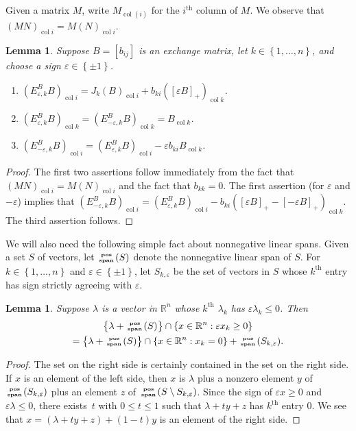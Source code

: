 \documentclass{amsart}
\newtheorem{lemma}[proposition]{Lemma}
\theoremstyle{definition}
\theoremstyle{remark}
\numberwithin{equation}{section}
\newcommand{\reals}{\mathbb R}
\newcommand{\ep}{\varepsilon}
\newcommand{\col}{\operatorname{col}}
\newcommand{\sgn}{\operatorname{sgn}}
\newcommand{\posspan}{\!\!\tiny\begin{array}{c}\mathbf{pos}\\\mathbf{span}\end{array}\!\!}
\newcommand{\set}[1]{{\left\lbrace #1 \right\rbrace}}
\renewcommand{\th}{^\text{th}}
\newcommand{\0}{{\mathbf{0}}}
\renewcommand{\th}{^\text{th}}
\begin{document}
Given a matrix $M$, write $M_{\col(i)}$ for the $i\th$ column of $M$.
We observe that $(MN)_{\col i}=M(N)_{\col i}$.
\begin{lemma}\label{columns lem}
Suppose $B=[b_{ij}]$ is an exchange matrix, let $k\in\set{1,\ldots,n}$, and choose a sign $\ep\in\set{\pm1}$.
\begin{enumerate}[\quad\bf1.]
\item \label{col i}
$(E_{\ep,k}^BB)_{\col i}=J_k(B)_{\col i}+b_{ki}([\ep B]_+)_{\col k}$.
\item \label{col k}
$(E_{\ep,k}^BB)_{\col k}=(E_{-\ep,k}^BB)_{\col k}=B_{\col k}$.
\item \label{cols k}
$(E_{-\ep,k}^BB)_{\col i}=(E_{\ep,k}^BB)_{\col i}-\ep b_{ki}B_{\col k}$.
\end{enumerate}
\end{lemma}
\begin{proof}
The first two assertions follow immediately from the fact that $(MN)_{\col i}=M(N)_{\col i}$ and the fact that $b_{kk}=0$.
The first assertion (for $\ep$ and $-\ep$) implies that $(E_{-\ep,k}^BB)_{\col i}=(E_{\ep,k}^BB)_{\col i}-b_{ki}([\ep B]_+-[-\ep B]_+)_{\col k}$.  
The third assertion follows.
\end{proof}

We will also need the following simple fact about nonnegative linear spans.
Given a set $S$ of vectors, let $\posspan(S)$ denote the nonnegative linear span of $S$.
For $k\in\set{1,\ldots,n}$ and $\ep\in\set{\pm1}$, let $S_{k,\ep}$ be the set of vectors in $S$ whose $k\th$ entry has sign strictly agreeing with $\ep$.

\begin{lemma}\label{ps lemma}
Suppose $\lambda$ is a vector in $\reals^n$ whose $k\th$ $\lambda_k$ has $\ep\lambda_k\le0$.
Then %
\begin{multline*}
\set{\lambda+\posspan(S)}\cap\set{x\in\reals^n:\ep x_k\ge0}\\
=\set{\lambda+\posspan(S)}\cap\set{x\in\reals^n:x_k=0}+\posspan(S_{k,\ep}).
\end{multline*}
\end{lemma}
\begin{proof}
The set on the right side is certainly contained in the set on the right side.
If $x$ is an element of the left side, then $x$ is $\lambda$ plus a nonzero element $y$ of $\posspan(S_{k,\ep})$ plus an element $z$ of $\posspan(S\setminus S_{k,\ep})$.
Since the sign of $\ep x\ge0$ and $\ep\lambda\le0$, there exists~$t$ with $0\le t\le1$ such that $\lambda+ty+z$ has $k\th$ entry $0$.
We see that ${x=(\lambda+ty+z)+(1-t)y}$ is an element of the right side.
\end{proof}
\end{document}
